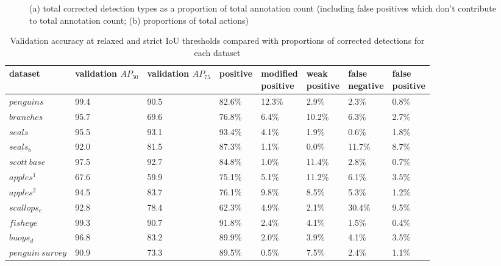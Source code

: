\begin{figure}[H]
\caption {(a) total corrected detection types as a proportion of total annotation count (including false positives which don't contribute to total annotation count; (b) proportions of total actions)}
\label{fig:actions_dataset}
\end{figure}

\begin{table}[h!]
\caption{Validation accuracy at relaxed and strict IoU thresholds compared with proportions of corrected detections for each dataset}
\label{fig:validation_corrections}
\begin{tabular}{llllllll}
dataset           & \shortstack{validation \\ $AP_{50}$} & \shortstack{validation  \\ $AP_{75}$} & positive & \shortstack{modified\\ positive} & \shortstack{weak\\ positive} & \shortstack{false \\ negative} & \shortstack{false \\ positive} \\
\toprule
$penguins$        & 99.4      & 90.5      & 82.6\%   & 12.3\%            & 2.9\%         & 2.3\%          & 0.8\%          \\
$branches$        & 95.7      & 69.6      & 76.8\%   & 6.4\%             & 10.2\%        & 6.3\%          & 2.7\%          \\
$seals$           & 95.5      & 93.1      & 93.4\%   & 4.1\%             & 1.9\%         & 0.6\%          & 1.8\%          \\
$seals_b$         & 92.0      & 81.5      & 87.3\%   & 1.1\%             & 0.0\%         & 11.7\%         & 8.7\%          \\
$scott\:base$     & 97.5      & 92.7      & 84.8\%   & 1.0\%             & 11.4\%        & 2.8\%          & 0.7\%          \\
$apples^1$        & 67.6      & 59.9      & 75.1\%   & 5.1\%             & 11.2\%        & 6.1\%          & 3.5\%          \\
$apples^2$        & 94.5      & 83.7      & 76.1\%   & 9.8\%             & 8.5\%         & 5.3\%          & 1.2\%          \\
$scallops_e$      & 92.8      & 78.4      & 62.3\%   & 4.9\%             & 2.1\%         & 30.4\%         & 9.5\%          \\
$fisheye$         & 99.3      & 90.7      & 91.8\%   & 2.4\%             & 4.1\%         & 1.5\%          & 0.4\%          \\
$buoys_d$         & 96.8      & 83.2      & 89.9\%   & 2.0\%             & 3.9\%         & 4.1\%          & 3.5\%          \\
$penguin\:survey$ & 90.9      & 73.3      & 89.5\%   & 0.5\%             & 7.5\%         & 2.4\%          & 1.1\%        \\
\bottomrule
\end{tabular}
\end{table}



